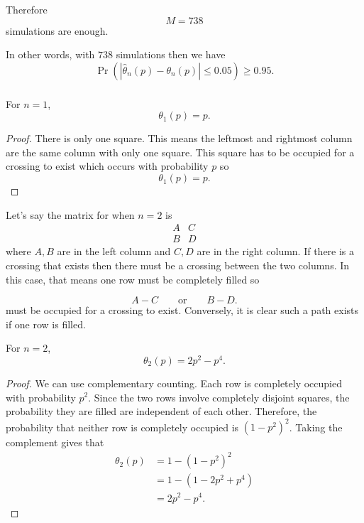 \documentclass[11pt]{scrartcl}
\begin{document}
\begin{soln}
			Therefore
			\[
			\boxed{M=738}
			\]
			simulations are enough.
			
			In other words, with $738$ simulations then we have
			\[
			\Pr\left(
			\left|
			\widehat{\theta}_n(p)-\theta_n(p)
			\right|
			\le0.05
			\right)
			\ge0.95.
			\]
			
			
			\subsubsection*{}
			
			\begin{claim*}
				For $n=1$,
				\[
				\boxed{\theta_1(p)=p}.
				\]
			\end{claim*}
			
			\begin{proof}
				There is only one square. This means the leftmost and rightmost column are the same column with only one square. This square has to be occupied for a crossing to exist which occurs with probability $p$ so 			
				\[
				\boxed{\theta_1(p)=p}.
				\]
			\end{proof}
			
			
			
			Let's say the matrix for when $n=2$ is 
			\[
			\begin{matrix}
				A & C\\
				B & D
			\end{matrix}
			\]
			where $A,B$ are in the left column and $C,D$ are in the right column.
			If there is a crossing that exists then there must be a crossing between the two columns. In this case, that means one row must be completely filled so 

			\[
			A-C
			\qquad\text{or}\qquad
			B-D.
			\]
			must be occupied for a crossing to exist. Conversely, it is clear 
            such a path exists if one row is filled.
			
			\begin{claim*}
				For $n=2$,
				\[
				\boxed{
					\theta_2(p)=2p^2-p^4.
				}
				\]
			\end{claim*}
			
			\begin{proof}
				We can use complementary counting. Each row is completely occupied with probability $p^2$. Since the two rows involve
                completely disjoint squares, the probability they are filled are independent of each other.
Therefore, the probability that neither row is completely
occupied is $(1-p^2)^2$. Taking the complement gives that
				\begin{align*}
					\theta_2(p)
					&=
					1-(1-p^2)^2\\
					&=
					1-\left(1-2p^2+p^4\right)\\
					&=
					\boxed{2p^2-p^4}.
				\end{align*}
			\end{proof}
			

\end{soln}
\end{document}
